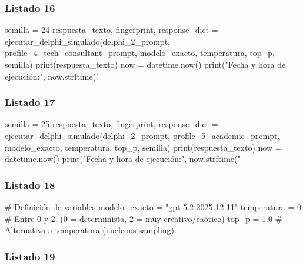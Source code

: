 \subsubsection{Listado 16}
\label{anexo:code-6-3-1-1-16}

\begin{APACode}
semilla = 24
respuesta_texto, fingerprint, response_dict = ejecutar_delphi_simulado(delphi_2_prompt, profile_4_tech_consultant_prompt, modelo_exacto, temperatura, top_p, semilla)
print(respuesta_texto)
now = datetime.now()
print("Fecha y hora de ejecución:", now.strftime("%
\end{APACode}

\subsubsection{Listado 17}
\label{anexo:code-6-3-1-1-17}

\begin{APACode}
semilla = 25
respuesta_texto, fingerprint, response_dict = ejecutar_delphi_simulado(delphi_2_prompt, profile_5_academic_prompt, modelo_exacto, temperatura, top_p, semilla)
print(respuesta_texto)
now = datetime.now()
print("Fecha y hora de ejecución:", now.strftime("%
\end{APACode}

\subsubsection{Listado 18}
\label{anexo:code-6-3-1-1-18}

\begin{APACode}
# Definición de variables
modelo_exacto = "gpt-5.2-2025-12-11"  
temperatura = 0         # Entre 0 y 2. (0 = determinista, 2 = muy creativo/caótico)
top_p = 1.0               # Alternativa a temperatura (nucleous sampling).
\end{APACode}

\subsubsection{Listado 19}
\label{anexo:code-6-3-1-1-19}

